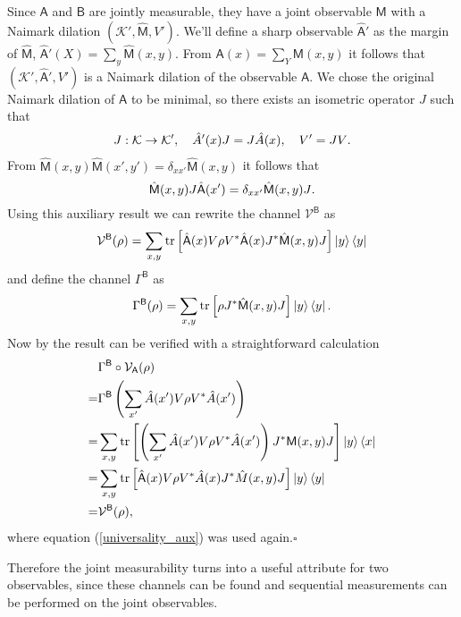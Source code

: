 \documentclass[a4paper,12pt]{wihuri}
\theoremstyle{definition}
\numberwithin{definition}{section}
\numberwithin{example}{section}
\numberwithin{theorem}{section}
\numberwithin{proposition}{section}
\numberwithin{lemma}{section}
\newcommand{\ki}{\mathcal{K}}%
\newcommand{\V}{\mathcal{V}}%
\newcommand{\A}{\mathsf{A}}%
\newcommand{\B}{\mathsf{B}}%
\newcommand{\M}{\mathsf{M}}%
\DeclareMathOperator{\tr}{tr}
\begin{document}
Since $\A$ and $\B$ are jointly measurable, they have a joint observable $\M$ with a Naimark dilation $(\ki', \hat{\M}, V')$. We'll define a sharp observable $\hat{\A}'$ as the margin of $\hat{\M}$, $\hat{\A}'(X) = \sum_y \hat{\M}(x,y)$. From $\A(x) = \sum_Y \M(x,y)$ it follows that $(\ki', \hat{\A}', V')$ is a Naimark dilation of the observable $\A$. We chose the original Naimark dilation of $\A$ to be minimal, so there exists an isometric operator $J$ such that
\begin{align*}
J : \ki \rightarrow \ki', \quad \hat{A}'(x)J = J\hat{A}(x), \quad V' = JV \text. 
\end{align*}
From $\hat{\M}(x,y) \hat{\M}(x', y') = \delta_{xx'}\hat{\M}(x,y)$ it follows that
\begin{equation}\label{universality_aux}
\hat{\M}(x,y)J\hat{\A}(x') = \delta_{xx'}\hat{\M}(x,y)J\text.
\end{equation}
Using this auxiliary result we can rewrite the channel $\V^{\B}$ as
\begin{align*}
\V^{\B}(\rho) = \sum_{x,y}\tr\left[\hat{\A}(x)V\rho V^*\hat{\A}(x)J^*\hat{\M}(x,y)J \right]\ket{y}\bra{y}
\end{align*}
and define the channel $\Gamma^{\B}$ as 
\begin{align*}
\Gamma^{\B}(\rho) = \sum_{x,y}\tr\left[\rho J^*\hat{\M}(x,y)J \right]\ket{y}\bra{y}\text.
\end{align*}
Now by the result can be verified with a straightforward calculation
\begin{align*}
&\Gamma^{\B} \circ \V_{\A}(\rho) \\
=&\Gamma^{\B} \left(\sum_{x'} \hat{A}(x') V\rho V^*\hat{A}(x') \right)\\
=&\sum_{x,y} \tr\left[\left(\sum_{x'}\hat{A}(x')V\rho V^*\hat{A}(x') \right)J^*\M(x,y)J \right]\ket{y}\bra{x} \\
=&\sum_{x,y}\tr\left[\hat{\A}(x)V\rho V^*\hat{A}(x)J^*\hat{M}(x,y)J \right]\ket{y}\bra{y}\\
=& \V^{\B}(\rho),
\end{align*}
where equation (\ref{universality_aux}) was used again.\hfill $\square$


Therefore the joint measurability turns into a useful attribute for two observables, since these channels can be found and sequential measurements can be performed on the joint observables.
\end{document}
